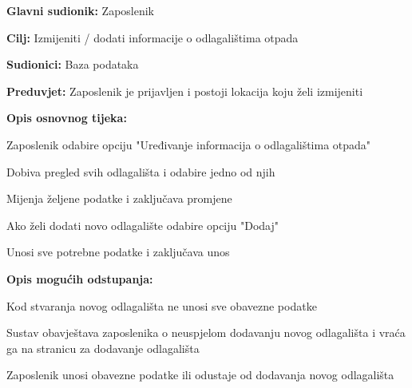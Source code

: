 				\noindent {}
				\begin{packed_item}
					
					\item \textbf{Glavni sudionik: }Zaposlenik
					\item  \textbf{Cilj:} Izmijeniti / dodati informacije o odlagalištima otpada
					\item  \textbf{Sudionici:} Baza podataka
					\item  \textbf{Preduvjet:} Zaposlenik je prijavljen i postoji lokacija koju želi izmijeniti
					\item  \textbf{Opis osnovnog tijeka:}
					
					\item[] \begin{packed_enum}
						
						\item Zaposlenik odabire opciju "Uređivanje informacija o odlagalištima otpada"
						\item Dobiva pregled svih odlagališta i odabire jedno od njih
						\item Mijenja željene podatke i zaključava promjene
						\item Ako želi dodati novo odlagalište odabire opciju "Dodaj"
						\item Unosi sve potrebne podatke i zaključava unos
					\end{packed_enum}
					
					\item  \textbf{Opis mogućih odstupanja:}
					
					\item[] \begin{packed_item}
						
						\item[2.a] Kod stvaranja novog odlagališta ne unosi sve obavezne podatke
						\item[] \begin{packed_enum}
							
							\item Sustav obavještava zaposlenika o neuspjelom dodavanju novog odlagališta i vraća ga na stranicu za dodavanje odlagališta
							\item Zaposlenik unosi obavezne podatke ili odustaje od dodavanja novog odlagališta
							
						\end{packed_enum}
						
						
					\end{packed_item}
				\end{packed_item}
			
